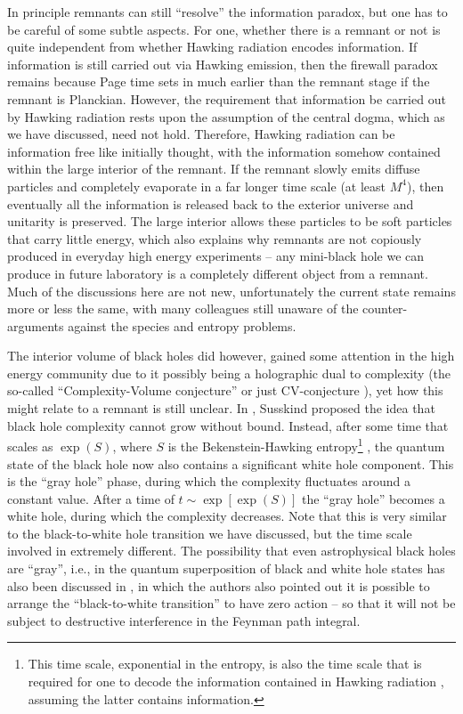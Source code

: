 \documentclass[12pt,preprintnumbers, floatfix, preprintnumbers, letterpaper, superscriptaddress,nofootinbib]{revtex4-2}
\begin{document}
In principle remnants can still ``resolve'' the information paradox, but one has to be careful of some subtle aspects. For one, whether there is a remnant or not is quite independent from whether Hawking radiation encodes information. If information is still carried out via Hawking emission, then the firewall paradox remains because Page time sets in much earlier than the remnant stage \cite{1412.8366} if the remnant is Planckian. However, the requirement that information be carried out by Hawking radiation rests upon the assumption of the central dogma, which as we have discussed, need not hold. Therefore, Hawking radiation can be information free like initially thought, with the information somehow contained within the large interior of the remnant. If the remnant slowly emits diffuse particles and completely evaporate in a far longer time scale (at least $M^4$), then eventually all the information is released back to the exterior universe and unitarity is preserved. The large interior allows these particles to be soft particles that carry little energy, which also explains why remnants are not copiously produced in everyday high energy experiments -- any mini-black hole we can produce in future laboratory is a completely different object from a remnant. Much of the discussions here are not new, unfortunately the current state remains more or less the same, with many colleagues still unaware of the counter-arguments against the species and entropy problems. 

The interior volume of black holes did however, gained some attention in the high energy community due to it possibly being a holographic dual to complexity (the so-called ``Complexity-Volume conjecture'' or just CV-conjecture \cite{1402.5674,1403.5695,1406.2678,1411.0690,1509.06614,1911.12561,2312.05731}), yet how this might relate to a remnant is still unclear. In \cite{1507.02287}, Susskind proposed the idea that black hole complexity cannot grow without bound. Instead, after some time that scales as $\exp{(S)}$, where $S$ is the Bekenstein-Hawking entropy\footnote{This time scale, exponential in the entropy, is also the time scale that is required for one to decode the information contained in Hawking radiation \cite{1301.4504}, assuming the latter contains information.} , the quantum state of the black hole now also contains a significant white hole component. This is the ``gray hole'' phase, during which the complexity fluctuates around a constant value. After a time of $t\sim \exp[{\exp{(S)}}]$ the ``gray hole'' becomes a white hole, during which the complexity decreases. Note that this is very similar to the black-to-white hole transition we have discussed, but the time scale involved in extremely different. The possibility that even astrophysical black holes are ``gray'', i.e., in the quantum superposition of black and white hole states has also been discussed in \cite{2304.10692}, in which the authors also pointed out it is possible to arrange the ``black-to-white transition'' to have zero action -- so that it will not be subject to destructive interference in the Feynman path integral.
 
\end{document}
